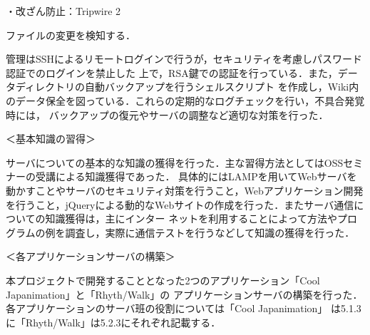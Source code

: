 \par ・改ざん防止：Tripwire 2
\par ファイルの変更を検知する．
\\
\par
管理はSSHによるリモートログインで行うが，セキュリティを考慮しパスワード認証でのログインを禁止した
上で，RSA鍵での認証を行っている．また，データディレクトリの自動バックアップを行うシェルスクリプト
を作成し，Wiki内のデータ保全を図っている．これらの定期的なログチェックを行い，不具合発覚時には，
バックアップの復元やサーバの調整など適切な対策を行った．
\\
\par ＜基本知識の習得＞
\par
サーバについての基本的な知識の獲得を行った．主な習得方法としてはOSSセミナーの受講による知識獲得であった．
具体的にはLAMPを用いてWebサーバを動かすことやサーバのセキュリティ対策を行うこと，Webアプリケーション開発
を行うこと，jQueryによる動的なWebサイトの作成を行った．またサーバ通信についての知識獲得は，主にインター
ネットを利用することによって方法やプログラムの例を調査し，実際に通信テストを行うなどして知識の獲得を行った．
\\
\par ＜各アプリケーションサーバの構築＞
\par
本プロジェクトで開発することとなった2つのアプリケーション「Cool Japanimation」と「Rhyth/Walk」の
アプリケーションサーバの構築を行った．各アプリケーションのサーバ班の役割については「Cool Japanimation」
は5.1.3に「Rhyth/Walk」は5.2.3にそれぞれ記載する．
